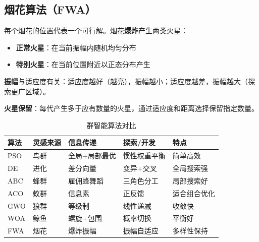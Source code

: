 \subsection{烟花算法（FWA）}

\begin{conceptbox}[FWA原理]
每个烟花的位置代表一个可行解。烟花\textbf{爆炸}产生两类火星：
\begin{itemize}[itemsep=0.3em]
    \item \textbf{正常火星}：在当前振幅内随机均匀分布
    \item \textbf{特别火星}：在当前位置附近以正态分布产生
\end{itemize}

\textbf{振幅}与适应度有关：适应度越好（越亮），振幅越小；适应度越差，振幅越大（探索更广区域）。

\textbf{火星保留}：每代产生多于应有数量的火星，通过适应度和距离选择保留指定数量。
\end{conceptbox}

\begin{table}[htbp]
\centering
\caption{群智能算法对比}
\begin{tabular}{@{}lllll@{}}
\toprule
\textbf{算法} & \textbf{灵感来源} & \textbf{信息传递} & \textbf{探索/开发} & \textbf{特点} \\
\midrule
PSO & 鸟群 & 全局+局部最优 & 惯性权重平衡 & 简单高效 \\
DE & 进化 & 差分向量 & 变异+交叉 & 全局搜索强 \\
ABC & 蜂群 & 雇佣蜂舞蹈 & 三角色分工 & 局部搜索好 \\
ACO & 蚁群 & 信息素 & 正反馈 & 适合组合优化 \\
GWO & 狼群 & 等级制 & 线性递减 & 收敛快 \\
WOA & 鲸鱼 & 螺旋+包围 & 概率切换 & 平衡好 \\
FWA & 烟花 & 爆炸振幅 & 振幅自适应 & 多样性保持 \\
\bottomrule
\end{tabular}
\end{table}

